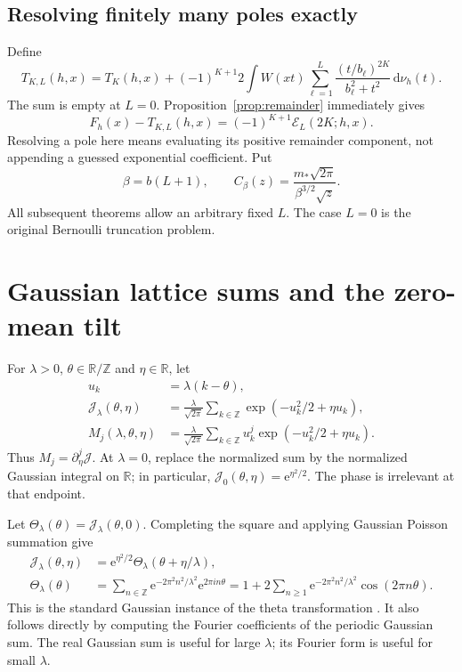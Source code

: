 \documentclass[11pt,a4paper]{article}
\numberwithin{equation}{section}
\theoremstyle{definition}\newtheorem{definition}[theorem]{Definition}
\theoremstyle{remark}\newtheorem{remark}[theorem]{Remark}
\newcommand{\e}{\mathrm e}
\newcommand{\dd}{\,\mathrm d}
\newcommand{\R}{\mathbb R}
\newcommand{\Z}{\mathbb Z}
\newcommand{\mstar}{m_*}
\newcommand{\calE}{\mathcal E}
\newcommand{\calJ}{\mathcal J}
\begin{document}
\subsection{Resolving finitely many poles exactly}
Define
\begin{equation}
 T_{K,L}(h,x)=T_K(h,x)+(-1)^{K+1}2\int W(xt)
    \sum_{\ell=1}^{L}\frac{(t/b_\ell)^{2K}}{b_\ell^2+t^2}\dd\nu_h(t).
 \label{eq:resolved}
\end{equation}
The sum is empty at $L=0$. Proposition~\ref{prop:remainder} immediately gives
\begin{equation}
 F_h(x)-T_{K,L}(h,x)=(-1)^{K+1}\calE_L(2K;h,x).
 \label{eq:resolved-error}
\end{equation}
Resolving a pole here means evaluating its positive remainder component,
not appending a guessed exponential coefficient. Put
\begin{equation}
 \beta=b(L+1),\qquad
 C_\beta(z)=\frac{\mstar\sqrt{2\pi}}{\beta^{3/2}\sqrt z}.
 \label{eq:beta}
\end{equation}
All subsequent theorems allow an arbitrary fixed $L$. The case $L=0$ is
the original Bernoulli truncation problem.

\section{Gaussian lattice sums and the zero-mean tilt}
\label{sec:theta}

For $\lambda>0$, $\theta\in\R/\Z$ and $\eta\in\R$, let
\begin{align}
 u_k&=\lambda(k-\theta),\\
 \calJ_\lambda(\theta,\eta)
 &=\frac{\lambda}{\sqrt{2\pi}}
       \sum_{k\in\Z}\exp(-u_k^2/2+\eta u_k),\label{eq:J}\\
 M_j(\lambda,\theta,\eta)
 &=\frac{\lambda}{\sqrt{2\pi}}
       \sum_{k\in\Z}u_k^j\exp(-u_k^2/2+\eta u_k).
 \label{eq:moments}
\end{align}
Thus $M_j=\partial_\eta^j\calJ$. At $\lambda=0$, replace the normalized
sum by the normalized Gaussian integral on $\R$; in particular,
$\calJ_0(\theta,\eta)=\e^{\eta^2/2}$. The phase is irrelevant at that
endpoint.

Let $\Theta_\lambda(\theta)=\calJ_\lambda(\theta,0)$. Completing the square
and applying Gaussian Poisson summation give
\begin{align}
 \calJ_\lambda(\theta,\eta)
 &=\e^{\eta^2/2}\Theta_\lambda(\theta+\eta/\lambda),\label{eq:shift}\\
 \Theta_\lambda(\theta)
 &=\sum_{n\in\Z}\e^{-2\pi^2n^2/\lambda^2}\e^{2\pi i n\theta}
 =1+2\sum_{n\ge1}\e^{-2\pi^2n^2/\lambda^2}\cos(2\pi n\theta).
 \label{eq:poisson}
\end{align}
This is the standard Gaussian instance of the theta transformation
\cite{dlmf-theta}. It also follows directly by computing the Fourier
coefficients of the periodic Gaussian sum. The real Gaussian sum is useful
for large $\lambda$; its Fourier form is useful for small $\lambda$.
\end{document}
